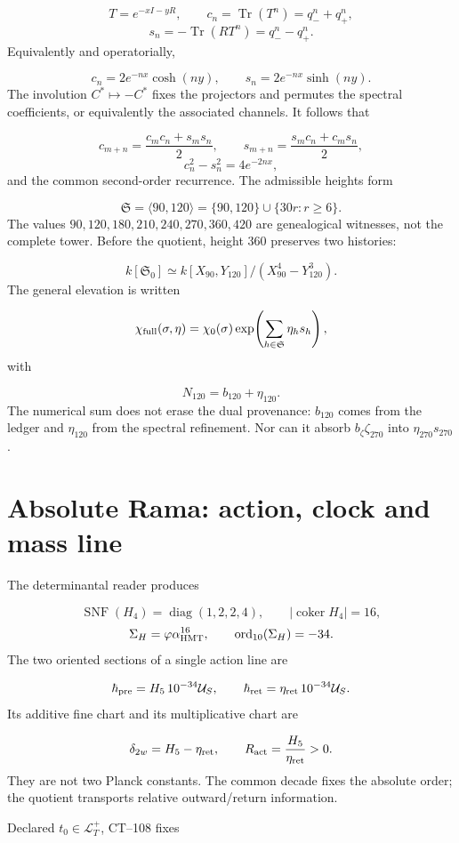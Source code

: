 \[
 T=e^{-xI-yR},\qquad
 c_n=\operatorname{Tr}(T^n)=q_-^n+q_+^n,
\]
\[
 s_n=-\operatorname{Tr}(RT^n)=q_-^n-q_+^n.
\]
Equivalently and operatorially,

\[
 c_n=2e^{-nx}\cosh(ny),\qquad
 s_n=2e^{-nx}\sinh(ny).
\]
The involution \(C^*\mapsto-C^*\) fixes the projectors and permutes the spectral coefficients, or equivalently the associated channels. It follows that

\[
 c_{m+n}=\frac{c_mc_n+s_ms_n}{2},\qquad
 s_{m+n}=\frac{s_mc_n+c_ms_n}{2},
\]
\[
 c_n^2-s_n^2=4e^{-2nx},
\]
and the common second-order recurrence. The admissible heights form

\[
 \mathfrak S=\langle90,120\rangle
 =\{90,120\}\cup\{30r:r\ge6\}.
\]
The values \(90,120,180,210,240,270,360,420\) are genealogical witnesses, not the complete tower. Before the quotient, height 360 preserves two histories:

\[
 k[\mathfrak S_0]
 \simeq k[X_{90},Y_{120}]/(X_{90}^4-Y_{120}^3).
\]
The general elevation is written

\[
 \chi_{\rm full}(\sigma,\eta)
 =\chi_0(\sigma)
  \exp\!\left(\sum_{h\in\mathfrak S}\eta_hs_h\right),
\]
with

\[
 N_{120}=b_{120}+\eta_{120}.
\]
The numerical sum does not erase the dual provenance: \(b_{120}\) comes from the ledger and \(\eta_{120}\) from the spectral refinement. Nor can it absorb \(b_\zeta\zeta_{270}\) into \(\eta_{270}s_{270}\).

\section{Absolute Rama: action, clock and mass line}
The determinantal reader produces

\[
 \operatorname{SNF}(H_4)=\operatorname{diag}(1,2,2,4),\qquad
 |\operatorname{coker}H_4|=16,
\]
\[
 \Sigma_H=\varphi\alpha_{\rm HMT}^{16},\qquad
 \operatorname{ord}_{10}(\Sigma_H)=-34.
\]
The two oriented sections of a single action line are

\[
 \hbar_{\rm pre}=H_5\,10^{-34}\mathcal U_S,
 \qquad
 \hbar_{\rm ret}=\eta_{\rm ret}\,10^{-34}\mathcal U_S.
\]
Its additive fine chart and its multiplicative chart are

\[
 \delta_{2w}=H_5-\eta_{\rm ret},\qquad
 R_{\rm act}=\frac{H_5}{\eta_{\rm ret}}>0.
\]
They are not two Planck constants. The common decade fixes the absolute order; the quotient transports relative outward/return information.

Declared \(t_0\in\mathcal L_T^+\), CT--108 fixes


